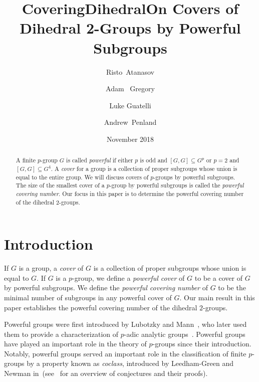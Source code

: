 \documentclass{amsart}
\title{CoveringDihedral}
\author{}
\date{November 2018}
\title[On Covers of Dihedral 2-Groups by Powerful Subgroups]
            {On Covers of Dihedral 2-Groups by Powerful Subgroups}
\author[R.~Atanasov]{Risto~Atanasov}
\author[A.~Gregory]{Adam ~Gregory}
\author[L.~Guatelli]{Luke Guatelli}
\author[A.~Penland]{Andrew~Penland}
\numberwithin{equation} {section}
\theoremstyle{definition}
\begin{document}
\maketitle

\begin{abstract}
A finite $p$-group $G$ is called \textit{powerful} if either $p$ is odd and $[G,G]\subseteq G^p$ or $p=2$ and $[G,G]\subseteq G^4$. A {\em{cover}} for a group is a collection of proper subgroups whose union is equal to the entire group. We will discuss covers of $p$-groups by powerful subgroups. The size of the smallest cover of a $p$-group by powerful subgroups is called the \textit{powerful covering number}. Our focus in this paper is to determine the powerful covering number of the dihedral 2-groups.
\end{abstract}



\maketitle

\section{Introduction}


If $G$ is a group, a \textit{cover} of $G$ is a collection of proper subgroups whose union is equal to $G$. If $G$ is a $p$-group, we define a \textit{powerful cover} of $G$ to be a cover of $G$ by powerful subgroups. We define the \textit{powerful covering number} of $G$ to be the minimal number of subgroups in any powerful cover of $G$. Our main result in this paper establishes the powerful covering number of the dihedral $2$-groups. 

 
Powerful groups were first introduced by Lubotzky and Mann~\cite{Lubotzky1}, who later used them to provide a characterization of $p$-adic analytic groups~\cite{Lubotzky2}. Powerful groups have played an important role in the theory of $p$-groups since their introduction. Notably, powerful groups served an important role in the classification of finite $p$-groups by a property known as \textit{coclass}, introduced by Leedham-Green and Newman in~\cite{Leedham1}(see~\cite{Leedham2} for an overview of conjectures and their proofs). 
\end{document}
